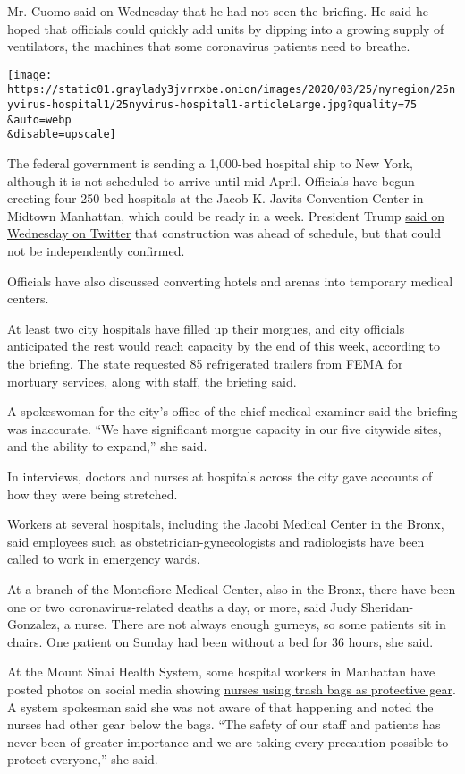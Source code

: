 Mr. Cuomo said on Wednesday that he had not seen the briefing. He said
he hoped that officials could quickly add units by dipping into a
growing supply of ventilators, the machines that some coronavirus
patients need to breathe.

\texttt{[image: https://static01.graylady3jvrrxbe.onion/images/2020/03/25/nyregion/25nyvirus-hospital1/25nyvirus-hospital1-articleLarge.jpg?quality=75\\\&auto=webp\\\&disable=upscale]}

The federal government is sending a 1,000-bed hospital ship to New York,
although it is not scheduled to arrive until mid-April. Officials have
begun erecting four 250-bed hospitals at the Jacob K. Javits Convention
Center in Midtown Manhattan, which could be ready in a week. President
Trump
\href{https://twitter.com/realDonaldTrump/status/1242826052310794240}{said
on Wednesday on Twitter} that construction was ahead of schedule, but
that could not be independently confirmed.

Officials have also discussed converting hotels and arenas into
temporary medical centers.

At least two city hospitals have filled up their morgues, and city
officials anticipated the rest would reach capacity by the end of this
week, according to the briefing. The state requested 85 refrigerated
trailers from FEMA for mortuary services, along with staff, the briefing
said.

A spokeswoman for the city's office of the chief medical examiner said
the briefing was inaccurate. ``We have significant morgue capacity in
our five citywide sites, and the ability to expand,'' she said.

In interviews, doctors and nurses at hospitals across the city gave
accounts of how they were being stretched.

Workers at several hospitals, including the Jacobi Medical Center in the
Bronx, said employees such as obstetrician-gynecologists and
radiologists have been called to work in emergency wards.

At a branch of the Montefiore Medical Center, also in the Bronx, there
have been one or two coronavirus-related deaths a day, or more, said
Judy Sheridan-Gonzalez, a nurse. There are not always enough gurneys, so
some patients sit in chairs. One patient on Sunday had been without a
bed for 36 hours, she said.

At the Mount Sinai Health System, some hospital workers in Manhattan
have posted photos on social media showing
\href{https://twitter.com/brianmrosenthal/status/1241744193648762882}{nurses
using trash bags as protective gear}. A system spokesman said she was
not aware of that happening and noted the nurses had other gear below
the bags. ``The safety of our staff and patients has never been of
greater importance and we are taking every precaution possible to
protect everyone,'' she said.

